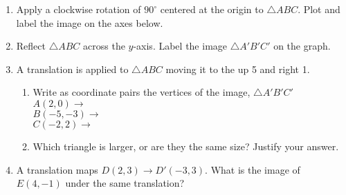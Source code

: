 \documentclass[12pt, twoside]{article}
\begin{document}
\begin{enumerate}[itemsep=0.5cm]
\item Apply a clockwise rotation of $90^\circ$ centered at the origin to $\triangle ABC$. Plot and label the image on the axes below.
  \begin{flushright}
  \end{flushright}

      
\newpage
\item  Reflect $\triangle ABC$ across the $y$-axis. Label the image $\triangle A'B'C'$ on the graph.
    \begin{center}
      \end{center}
  
\item A translation is applied to $\triangle ABC$ moving it to the up 5 and right 1.
  \begin{enumerate}
    \item Write as coordinate pairs the vertices of the image, $\triangle A'B'C'$ \\[0.3cm]
    $A(2,0) \rightarrow$ \\[0.7cm]
    $B(-5,-3) \rightarrow$ \\[0.7cm]
    $C(-2,2) \rightarrow$ %
    \item Which triangle is larger, or are they the same size? Justify your answer.
  \end{enumerate} \vspace{2cm}
  
  
\item A translation maps $D(2,3) \rightarrow D'(-3,3)$. What is the image of $E(4,-1)$ under the same translation? \vspace{2cm}


\end{enumerate}
\end{document}
